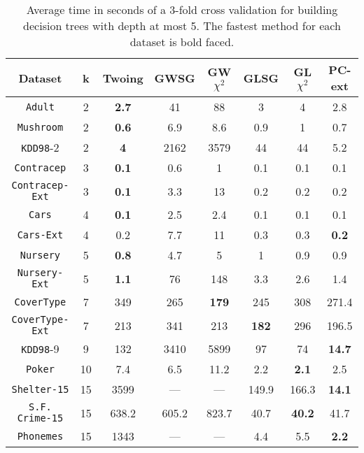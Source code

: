 \begin{table*}[]
\small
\centering
\caption{Average time in seconds of a 3-fold cross validation
for building decision trees with depth at most 5.
The fastest method for each dataset is bold faced.}
\begin{tabular}{c|c|c|c|c|c|c|c}
Dataset             & k  & Twoing     & GWSG  & GW$\chi^2$  & GLSG      & GL$\chi^2$ & PC-ext     \\ \hline
{\tt Adult}         & 2  & {\bf  2.7} & 41    & 88          & 3         & 4          & 2.8        \\
{\tt Mushroom}      & 2  & {\bf 0.6}  & 6.9   & 8.6         & 0.9       & 1          & 0.7        \\
{\tt KDD98}-2       & 2  & {\bf 4}    & 2162  & 3579        & 44        & 44         & 5.2        \\
{\tt Contracep}     & 3  & {\bf 0.1}  & 0.6   & 1           & 0.1       & 0.1        & 0.1        \\
{\tt Contracep-Ext} & 3  & {\bf 0.1}  & 3.3   & 13          & 0.2       & 0.2        & 0.2        \\
{\tt Cars}          & 4  & {\bf 0.1}  & 2.5   & 2.4         & 0.1       & 0.1        & 0.1        \\
{\tt Cars-Ext}      & 4  & 0.2        & 7.7   & 11          & 0.3       & 0.3        & {\bf 0.2}  \\
{\tt Nursery}       & 5  & {\bf 0.8}  & 4.7   & 5           & 1         & 0.9        & 0.9        \\
{\tt Nursery-Ext}   & 5  & {\bf 1.1}  & 76    & 148         & 3.3       & 2.6        & 1.4        \\
{\tt CoverType}     & 7  & 349        & 265   & {\bf 179}   & 245       & 308        & 271.4      \\
{\tt CoverType-Ext} & 7  & 213        & 341   & 213         & {\bf 182} & 296        & 196.5      \\
{\tt KDD98}-9       & 9  & 132        & 3410  & 5899        & 97        & 74         & {\bf 14.7 }\\ 
{\tt Poker}         & 10 & 7.4        & 6.5   & 11.2        & 2.2       & {\bf 2.1}  & 2.5        \\
{\tt Shelter-15}    & 15 & 3599       & ---   & ---         & 149.9     & 166.3      & {\bf 14.1 }\\   
{\tt S.F. Crime-15} & 15 & 638.2      & 605.2 & 823.7       & 40.7      & {\bf 40.2} & 41.7       \\ 
{\tt Phonemes}      & 15 & 1343       & ---   & ---         & 4.4       & 5.5        & {\bf 2.2 }
\end{tabular}
\label{tab:time-5}
\end{table*}



